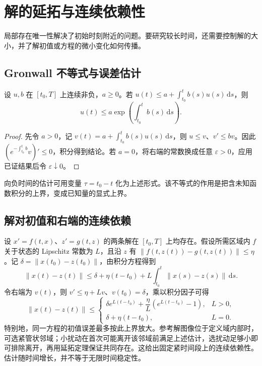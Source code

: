 \documentclass[UTF8,12pt,a4paper,fontset=fandol]{ctexbook}
\begin{document}
\chapter{解的延拓与连续依赖性}
\label{chap:ode-dependence}

局部存在唯一性解决了初始时刻附近的问题。要研究较长时间，还需要控制解的大小，并了解初值或方程的微小变化如何传播。

\section{Gronwall 不等式与误差估计}
\begin{theorem}
\label{thm:ode-gronwall}
设 $u,b$ 在 $[t_0,T]$ 上连续非负，$a\geq0$。若 $u(t)\leq a+\int_{t_0}^t b(s)u(s)\,\mathrm ds$，则
\[
 u(t)\leq a\exp\!\left(\int_{t_0}^t b(s)\,\mathrm ds\right).
\]
\end{theorem}
\begin{proof}
先令 $a>0$，记 $v(t)=a+\int_{t_0}^t b(s)u(s)\,\mathrm ds$，则 $u\leq v$、$v'\leq bv$。因此 $(e^{-\int_{t_0}^t b}v)'\leq0$，积分得到结论。若 $a=0$，将右端的常数换成任意 $\varepsilon>0$，应用已证结果后令 $\varepsilon\downarrow0$。
\end{proof}

向负时间的估计可用变量 $\tau=t_0-t$ 化为上述形式。该不等式的作用是把含未知函数积分的上界，变成已知量的显式上界。

\section{解对初值和右端的连续依赖}
设 $x'=f(t,x)$、$z'=g(t,z)$ 的两条解在 $[t_0,T]$ 上均存在。假设所需区域内 $f$ 关于状态的 Lipschitz 常数为 $L$，且沿 $z$ 有 $\|f(t,z(t))-g(t,z(t))\|\leq\eta$。记 $\delta=\|x(t_0)-z(t_0)\|$，由积分方程得到
\[
 \|x(t)-z(t)\|\leq\delta+\eta(t-t_0)+L\int_{t_0}^t\|x(s)-z(s)\|\,\mathrm ds.
\]
令右端为 $v(t)$，则 $v'\leq\eta+Lv$、$v(t_0)=\delta$，乘以积分因子可得
\begin{equation}
 \|x(t)-z(t)\|\leq
 \begin{cases}
 \delta e^{L(t-t_0)}+\dfrac{\eta}{L}(e^{L(t-t_0)}-1),&L>0,\\
 \delta+\eta(t-t_0),&L=0.
 \end{cases}
 \label{eq:ode-dependence-bound}
\end{equation}
特别地，同一方程的初值误差最多按此上界放大。参考解图像位于定义域内部时，可选紧管状邻域；小扰动在首次可能离开该邻域前满足上述估计，选扰动足够小即可排除离开，再用延拓定理保证共同存在。这给出固定紧时间段上的连续依赖性。估计随时间增长，并不等于无限时间稳定性。
\end{document}
